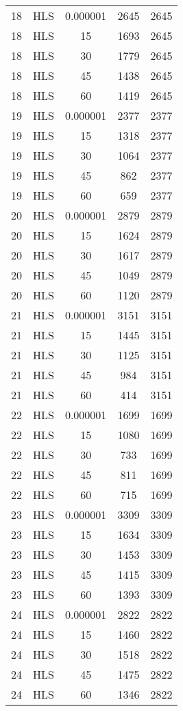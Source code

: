 \begin{center}
\begin{longtable}{ccccc}
18	&	HLS	&	0.000001	&	2645	&	2645	\\
18	&	HLS	&	15	&	1693	&	2645	\\
18	&	HLS	&	30	&	1779	&	2645	\\
18	&	HLS	&	45	&	1438	&	2645	\\
18	&	HLS	&	60	&	1419	&	2645	\\
19	&	HLS	&	0.000001	&	2377	&	2377	\\
19	&	HLS	&	15	&	1318	&	2377	\\
19	&	HLS	&	30	&	1064	&	2377	\\
19	&	HLS	&	45	&	862	&	2377	\\
19	&	HLS	&	60	&	659	&	2377	\\
20	&	HLS	&	0.000001	&	2879	&	2879	\\
20	&	HLS	&	15	&	1624	&	2879	\\
20	&	HLS	&	30	&	1617	&	2879	\\
20	&	HLS	&	45	&	1049	&	2879	\\
20	&	HLS	&	60	&	1120	&	2879	\\
21	&	HLS	&	0.000001	&	3151	&	3151	\\
21	&	HLS	&	15	&	1445	&	3151	\\
21	&	HLS	&	30	&	1125	&	3151	\\
21	&	HLS	&	45	&	984	&	3151	\\
21	&	HLS	&	60	&	414	&	3151	\\
22	&	HLS	&	0.000001	&	1699	&	1699	\\
22	&	HLS	&	15	&	1080	&	1699	\\
22	&	HLS	&	30	&	733	&	1699	\\
22	&	HLS	&	45	&	811	&	1699	\\
22	&	HLS	&	60	&	715	&	1699	\\
23	&	HLS	&	0.000001	&	3309	&	3309	\\
23	&	HLS	&	15	&	1634	&	3309	\\
23	&	HLS	&	30	&	1453	&	3309	\\
23	&	HLS	&	45	&	1415	&	3309	\\
23	&	HLS	&	60	&	1393	&	3309	\\
24	&	HLS	&	0.000001	&	2822	&	2822	\\
24	&	HLS	&	15	&	1460	&	2822	\\
24	&	HLS	&	30	&	1518	&	2822	\\
24	&	HLS	&	45	&	1475	&	2822	\\
24	&	HLS	&	60	&	1346	&	2822	\\
\end{longtable}    
\end{center}







